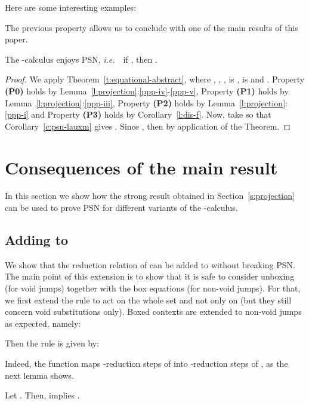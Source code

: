 \documentclass{LMCS}
\newcommand{\ie}{{\it  i.e.}~}
\renewcommand{\>}{\rightarrow}
\begin{document}
Here are some interesting examples:




The previous property allows us to conclude with one of the main
results of this paper. 

\begin{thm}
\label{t:psn-ldisf}
The -calculus enjoys PSN, \ie\ if , then 
.
\end{thm}

\begin{proof} 
We apply Theorem~\ref{t:equational-abstract}, where ,
, 
,  is
,  is  and
. Property {\bf (P0)} holds by
Lemma~\ref{l:projection}:\ref{ppp-iv}-\ref{ppp-v}, Property {\bf (P1)}
holds by Lemma~\ref{l:projection}:\ref{ppp-iii}, Property {\bf (P2)}
holds by Lemma~\ref{l:projection}:\ref{ppp-i} and
Property {\bf (P3)} holds by Corollary~\ref{l:dis-f}.  Now, take  so that Corollary~\ref{c:psn-lauxm}
gives . Since , then  by application of the Theorem.
\end{proof}

\section{Consequences of the main result}
\label{s:cons}

In this section we show how the strong result obtained in
  Section~\ref{s:projection} can be used to
  prove PSN for different variants of
the -calculus.
\subsection{Adding  to }
\label{s:ldisf+n+u}
We show that the reduction relation
 of
 can be added to  without breaking PSN. The main point
of this extension is to show that it is safe to consider unboxing (for void jumps)
 together with the box equations (for non-void jumps). 
For that, we first extend the 
rule 
to act on the whole set  and not only on  (but
  they still concern void substitutions only). Boxed contexts are extended to non-void jumps as expected, namely:

Then the rule is given by:
 
 Indeed, the  function maps -reduction steps of
  into -reduction steps of , as the next lemma shows.

\begin{lem}
\label{l:projectionext}
Let . Then, 
 implies  .
\end{lem}
\end{document}
